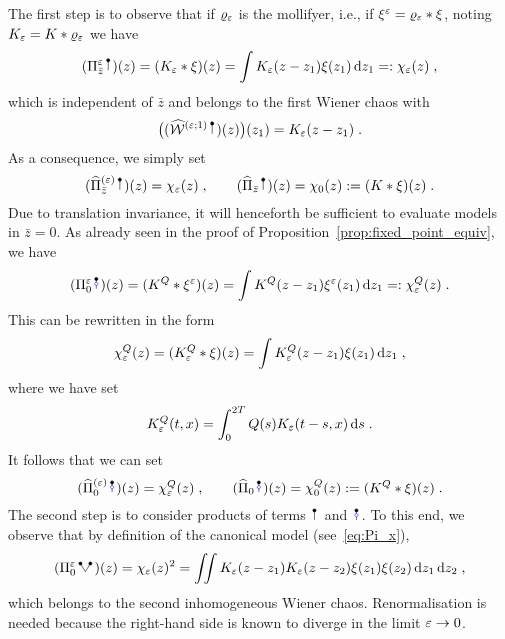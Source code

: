 \documentclass[reqno,11pt]{article}
\def\KQ{K^Q}
\def\chiQ{\chi^Q}
\begin{document}
The first step is to observe that if $\varrho_\varepsilon$ is the mollifyer, i.e., if
$\xi^\varepsilon=\varrho_\varepsilon*\xi$, noting $K_\varepsilon=K*\varrho_\varepsilon$ we have 
\begin{equation}
 \label{eq:rFHN05}
 (\Pi_{\bar z}^\eps \RSI)(z) = (K_\eps * \xi)(z)
 = \int K_\eps(z-z_1)\xi(z_1)\6z_1 =: \chi_\eps(z)\;, 
\end{equation} 
which is independent of $\bar z$ and belongs to the first Wiener chaos 
with 
\begin{equation}
 \label{eq:rFHN06} 
 \bigpar{(\widehat\cW^{(\eps;1)}\RSI)(z)}(z_1) = K_\eps(z-z_1)\;.
\end{equation} 
As a consequence, we simply set 
\begin{equation}
 \label{eq:rFHN06a}
 (\widehat \Pi_{\bar z}^{(\eps)}\RSI)(z) = \chi_\eps(z)\;, 
 \qquad
 (\widehat \Pi_{\bar z}\RSI)(z) = \chi_0(z) := (K*\xi)(z)\;.
\end{equation} 
Due to translation invariance, it will henceforth be sufficient to evaluate
models in $\bar z=0$. As already seen in the proof of
Proposition~\ref{prop:fixed_point_equiv}, we have 
\begin{equation}
\label{eq:rFHN05b}
 (\Pi_0^\eps \RSoI)(z) = (\KQ * \xi^\eps)(z) 
 = \int \KQ(z-z_1)\xi^\eps(z_1)\6z_1  =: \chiQ_\eps(z)\;.
\end{equation} 
This can be rewritten in the form 
\begin{equation}
 \label{eq:rFHN05c} 
 \chiQ_\eps(z) = (\KQ_\eps * \xi)(z)
 = \int \KQ_\eps(z-z_1)\xi(z_1)\6z_1\;, 
\end{equation}
where we have set 
\begin{equation}
 \label{eq:rFHN05d}
 \KQ_\eps(t,x) = \int_0^{2T} Q(s)K_\eps(t-s,x)\6s\;.
\end{equation} 
It follows that we can set 
\begin{equation}
 \label{eq:rFHN05e}
 (\widehat \Pi_0^{(\eps)}\RSoI)(z) = \chiQ_\eps(z)\;, 
 \qquad
 (\widehat \Pi_0\RSoI)(z) = \chiQ_0(z) := (\KQ*\xi)(z)\;.
\end{equation}
The second step is to consider products of terms $\RSI$ and $\RSoI$. To this
end, we observe that by definition of the canonical model (see~\eqref{eq:Pi_x}),
\begin{equation}
 \label{eq:rFHN07}
 (\Pi_0^\eps \RSV)(z) = \chi_\eps(z)^2 
 = \iint K_\eps(z-z_1)K_\eps(z-z_2)\xi(z_1)\xi(z_2) \6z_1\6z_2\;,
\end{equation} 
which belongs to the second inhomogeneous Wiener chaos. Renormalisation is
needed because the right-hand side is known to diverge in the limit $\varepsilon\to0$.
\end{document}
